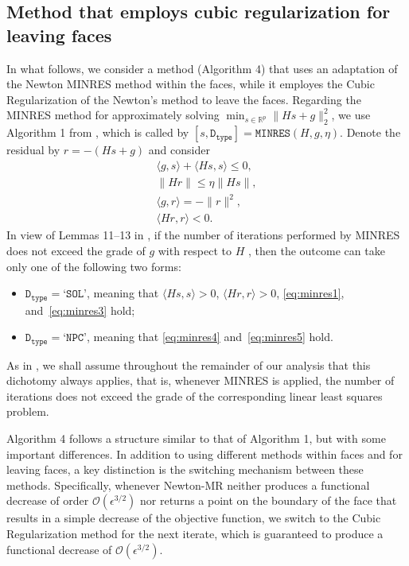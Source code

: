 \documentclass[11pt]{article}
\begin{document}
\subsection{Method that employs cubic regularization for leaving faces} \label{sec22}

In what follows, we consider a method (Algorithm 4) that uses an adaptation of the Newton MINRES method \cite{Liu2023} within the faces, while it employes the Cubic Regularization of the Newton's method \cite{BM} to leave the faces. Regarding the MINRES method for approximately solving $\min_{s\in\mathbb{R}^{p}}\|Hs+g\|_{2}^{2}$, we use Algorithm 1 from \cite{Liu2023}, which is called by $\left[s,\texttt{D}_{\texttt{type}}\right] = \texttt{MINRES}\left(H,g,\eta\right)$. Denote the residual by $r=-(Hs+g)$ and consider
\begin{eqnarray} 
&\langle g,s\rangle+\langle Hs,s\rangle\leq 0,& \label{eq:minres1} \\
&\|Hr\|\leq\eta\|Hs\|,& \label{eq:minres3} \\
&\langle g,r\rangle=-\|r\|^{2},& \label{eq:minres4} \\
&\langle Hr,r\rangle<0.& \label{eq:minres5}
\end{eqnarray}
In view of Lemmas 11--13 in \cite{Liu2023}, if the number of iterations performed by MINRES does not exceed the grade of $g$ with respect to $H$ \cite[Def.~1]{Liu2023}, then the outcome can take only one of the following two forms:
\vspace{0.2cm}
\begin{itemize}
  \item $\texttt{D}_{\texttt{type}}=\texttt{`SOL'}$, meaning that 
  $\langle Hs,s\rangle>0$, $\langle Hr,r\rangle>0$, \eqref{eq:minres1}, and~\eqref{eq:minres3} hold;
  \item $\texttt{D}_{\texttt{type}}=\texttt{`NPC'}$, meaning that 
  \eqref{eq:minres4} and~\eqref{eq:minres5} hold.
\end{itemize}
\vspace{0.2cm}
\noindent As in \cite{Liu2023}, we shall assume throughout the remainder of our analysis that this dichotomy always applies, that is, whenever MINRES is applied, the number of iterations does not exceed the grade of the corresponding linear least squares problem.

Algorithm 4 follows a structure similar to that of Algorithm 1, but with some important differences. In addition to using different methods within faces and for leaving faces, a key distinction is the switching mechanism between these methods. Specifically, whenever Newton-MR neither produces a functional decrease of order $\mathcal{O}(\epsilon^{3/2})$ nor returns a point on the boundary of the face that results in a simple decrease of the objective function, we switch to the Cubic Regularization method for the next iterate, which is guaranteed to produce a functional decrease of $\mathcal{O}(\epsilon^{3/2})$.
\end{document}
